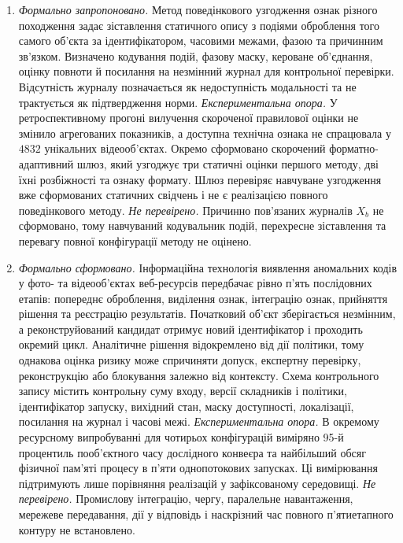 \begin{enumerate}[label=\arabic*.]
\item \textit{Формально запропоновано.} Метод поведінкового узгодження ознак різного походження задає зіставлення статичного опису з подіями оброблення того самого об’єкта за ідентифікатором, часовими межами, фазою та причинним зв’язком. Визначено кодування подій, фазову маску, кероване об’єднання, оцінку повноти й посилання на незмінний журнал для контрольної перевірки. Відсутність журналу позначається як недоступність модальності та не трактується як підтвердження норми. \textit{Експериментальна опора.} У ретроспективному прогоні вилучення скороченої правилової оцінки не змінило агрегованих показників, а доступна технічна ознака не спрацювала у $4832$ унікальних відеооб’єктах. Окремо сформовано скорочений форматно-адаптивний шлюз, який узгоджує три статичні оцінки першого методу, дві їхні розбіжності та ознаку формату. Шлюз перевіряє навчуване узгодження вже сформованих статичних свідчень і не є реалізацією повного поведінкового методу. \textit{Не перевірено.} Причинно пов’язаних журналів $X_b$ не сформовано, тому навчуваний кодувальник подій, перехресне зіставлення та перевагу повної конфігурації методу не оцінено.

\item \textit{Формально сформовано.} Інформаційна технологія виявлення аномальних кодів у фото- та відеооб’єктах веб-ресурсів передбачає рівно п’ять послідовних етапів: попереднє оброблення, виділення ознак, інтеграцію ознак, прийняття рішення та реєстрацію результатів. Початковий об’єкт зберігається незмінним, а реконструйований кандидат отримує новий ідентифікатор і проходить окремий цикл. Аналітичне рішення відокремлено від дії політики, тому однакова оцінка ризику може спричиняти допуск, експертну перевірку, реконструкцію або блокування залежно від контексту. Схема контрольного запису містить контрольну суму входу, версії складників і політики, ідентифікатор запуску, вихідний стан, маску доступності, локалізації, посилання на журнал і часові межі. \textit{Експериментальна опора.} В окремому ресурсному випробуванні для чотирьох конфігурацій виміряно 95-й процентиль пооб’єктного часу дослідного конвеєра та найбільший обсяг фізичної пам’яті процесу в п’яти однопотокових запусках. Ці вимірювання підтримують лише порівняння реалізацій у зафіксованому середовищі. \textit{Не перевірено.} Промислову інтеграцію, чергу, паралельне навантаження, мережеве передавання, дії у відповідь і наскрізний час повного п’ятиетапного контуру не встановлено.


\end{enumerate}
